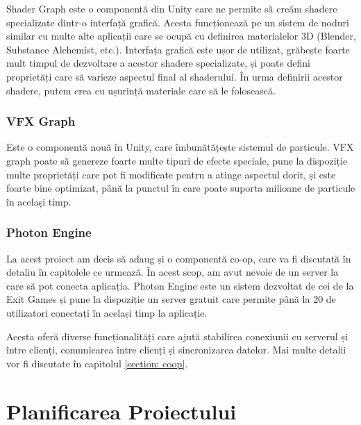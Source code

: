 \documentclass[12pt, a4paper]{article}
\begin{document}
	Shader Graph este o componentă din Unity care ne permite să creăm shadere specializate dintr-o interfață grafică. Acesta funcționează pe un sistem de noduri similar cu multe alte aplicații care se ocupă cu definirea materialelor 3D (Blender, Substance Alchemist, etc.). Interfața grafică este ușor de utilizat, grăbește foarte mult timpul de dezvoltare a acestor shadere specializate, și poate defini proprietăți care să varieze aspectul final al shaderului. În urma definirii acestor shadere, putem crea cu ușurință materiale care să le folosească.
	
	
	
	
	
	\subsubsection{VFX Graph}
	
	Este o componentă nouă în Unity, care îmbunătățește sistemul de particule. VFX graph poate să genereze foarte multe tipuri de efecte speciale, pune la dispoziție multe proprietăți care pot fi modificate pentru a atinge aspectul dorit, și este foarte bine optimizat, până la punctul în care poate suporta milioane de particule în același timp.
	
	
	
	
	
	\subsubsection{Photon Engine}
	
	La acest proiect am decis să adaug și o componentă co-op, care va fi discutată în detaliu în capitolele ce urmează. În acest scop, am avut nevoie de un server la care să pot conecta aplicația. Photon Engine este un sistem dezvoltat de cei de la Exit Games și pune la dispoziție un server gratuit care permite până la 20 de utilizatori conectați în același timp la aplicație.
	\newline
	
	Acesta oferă diverse funcționalități care ajută stabilirea conexiunii cu serverul și între clienți, comunicarea între clienți și sincronizarea datelor. Mai multe detalii vor fi discutate în capitolul \hyperref[section: coop]{\ref{section: coop}}.
	
	
	
	
	
	\section{Planificarea Proiectului}
\end{document}
